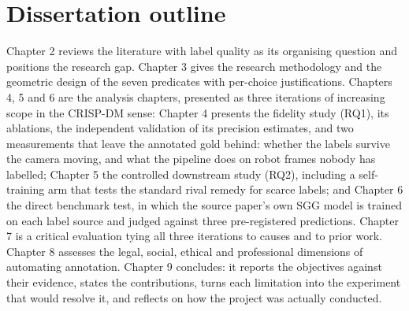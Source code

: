 \section{Dissertation outline}

Chapter 2 reviews the literature with label quality as its organising question and positions the research gap. Chapter 3 gives the research methodology and the geometric design of the seven predicates with per-choice justifications. Chapters 4, 5 and 6 are the analysis chapters, presented as three iterations of increasing scope in the CRISP-DM sense: Chapter 4 presents the fidelity study (RQ1), its ablations, the independent validation of its precision estimates, and two measurements that leave the annotated gold behind: whether the labels survive the camera moving, and what the pipeline does on robot frames nobody has labelled; Chapter 5 the controlled downstream study (RQ2), including a self-training arm that tests the standard rival remedy for scarce labels; and Chapter 6 the direct benchmark test, in which the source paper's own SGG model is trained on each label source and judged against three pre-registered predictions. Chapter 7 is a critical evaluation tying all three iterations to causes and to prior work. Chapter 8 assesses the legal, social, ethical and professional dimensions of automating annotation. Chapter 9 concludes: it reports the objectives against their evidence, states the contributions, turns each limitation into the experiment that would resolve it, and reflects on how the project was actually conducted.